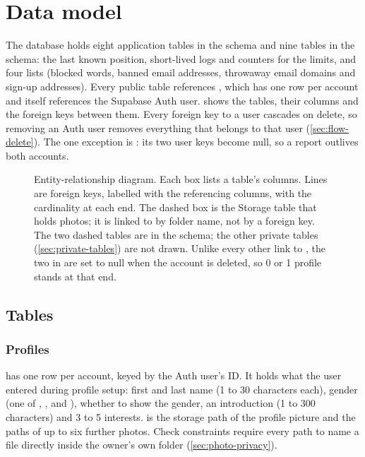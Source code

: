 \chapter{Data model}
\label{ch:data-model}

The database holds eight application tables in the  schema and nine tables in the
 schema: the last known position, short-lived logs and counters for the limits, and four lists
(blocked words, banned email addresses, throwaway email domains and sign-up addresses). Every public table
references , which has one row per account and itself
references the Supabase Auth user.  shows the tables, their columns and the foreign keys
between them. Every foreign key to a user cascades on delete, so removing an Auth user removes everything
that belongs to that user (\cref{sec:flow-delete}). The one exception is : its two user
keys become null, so a report outlives both accounts.

\begin{figure}[p]
  \centering
  
  \caption{Entity-relationship diagram. Each box lists a table's columns. Lines are foreign keys,
    labelled with the referencing columns, with the cardinality at each end. The dashed box is the
    Storage table that holds photos; it is linked to  by folder name, not by a foreign
    key. The two dashed tables are in the  schema; the other private tables
    (\cref{sec:private-tables}) are not drawn. Unlike every other link to , the two in
     are set to null when the account is deleted, so 0 or 1 profile stands at that end.}
  \label{fig:er}
\end{figure}

\section{Tables}
\label{sec:tables}

\subsection{Profiles}

 has one row per account, keyed by the Auth user's ID. It holds what the user entered
during profile setup: first and last name (1 to 30 characters each), gender (one of ,
,  and ), whether to show the gender, an introduction (1 to
300 characters) and 3 to 5 interests.  is the storage path of the profile picture and
 the paths of up to six further photos. Check constraints require every path to name a
file directly inside the owner's own folder (\cref{sec:photo-privacy}).

